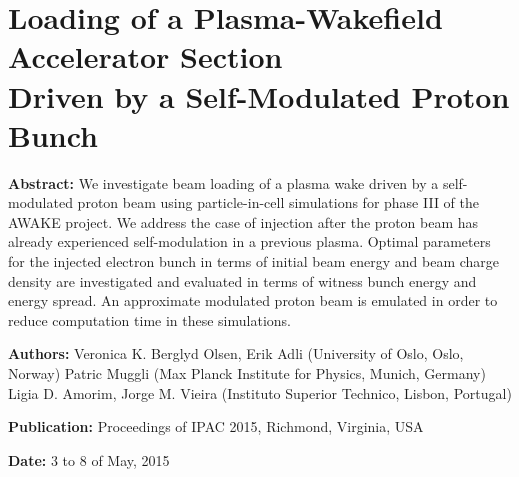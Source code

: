 %
%

\chapter{Loading of a Plasma-Wakefield Accelerator Section\\
         Driven by a Self-Modulated Proton Bunch}
\label{Pub:IPAC15}

\begin{hangparas}{10mm}{1}

    \textbf{Abstract:}
    We investigate beam loading of a plasma wake driven by a self-modulated proton beam using particle-in-cell simulations for phase III of the AWAKE project. We address the case of injection after the proton beam has already experienced self-modulation in a previous plasma. Optimal parameters for the injected electron bunch in terms of initial beam energy and beam charge density are investigated and evaluated in terms of witness bunch energy and energy spread. An approximate modulated proton beam is emulated in order to reduce computation time in these simulations.

    \vspace{8mm}

    \textbf{Authors:}
    Veronica K. Berglyd Olsen, Erik Adli (University of Oslo, Oslo, Norway)
    Patric Muggli (Max Planck Institute for Physics, Munich, Germany)
    Ligia D. Amorim, Jorge M. Vieira (Instituto Superior Technico, Lisbon, Portugal)

    \vspace{5mm}

    \textbf{Publication:}
    Proceedings of IPAC 2015, Richmond, Virginia, USA

    \vspace{5mm}

    \textbf{Date:} 3 to 8 of May, 2015

\end{hangparas}
